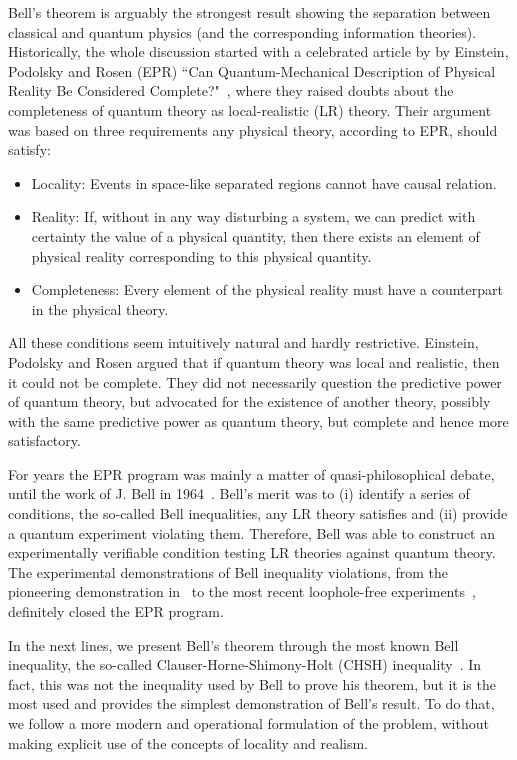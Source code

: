 \documentclass[a4paper]{article}
\begin{document}
Bell's theorem is arguably the strongest result showing the separation between classical and quantum physics (and the corresponding information theories). Historically, the whole discussion started with a celebrated article by by Einstein, Podolsky and
Rosen (EPR) ``Can Quantum-Mechanical Description of Physical Reality
Be Considered Complete?"~\cite{EPR}, where they raised doubts about the
completeness of quantum theory as local-realistic (LR) theory. Their argument was based on three requirements any physical theory, according to EPR, should
satisfy:
\begin{itemize}
    \item Locality: Events in space-like separated regions cannot have
    causal relation.
    \item Reality: If, without in any way disturbing a system, we
    can predict with certainty the value of a physical quantity,
    then there exists an element of physical reality corresponding
    to this physical quantity.
    \item Completeness: Every element of the physical reality must
    have a counterpart in the physical theory.
\end{itemize}
All these conditions seem intuitively natural and hardly
restrictive. Einstein, Podolsky and Rosen argued that if quantum theory was local and realistic, then it could not be complete. They did not necessarily question the predictive power of quantum theory, but advocated for the existence of another theory, possibly with the same predictive power as quantum theory, but complete and hence more satisfactory. 

For years the EPR program was mainly a matter of
quasi-philosophical debate, until the work of J. Bell in 1964~\cite{Bell}. Bell's merit was to (i) identify a series of
conditions, the so-called Bell inequalities, any LR theory
satisfies and (ii) provide a quantum experiment violating them.
Therefore, Bell was able to construct an experimentally verifiable
condition testing LR theories against quantum theory. The experimental
demonstrations of Bell inequality violations, from the pioneering demonstration in~\cite{Aspect,exp} to the most recent loophole-free experiments~\cite{hanson,nist,vienna}, definitely closed the EPR program. 


In the next lines, we present Bell's theorem through the most known Bell inequality, the
so-called Clauser-Horne-Shimony-Holt (CHSH) inequality~\cite{CHSH}. In fact, this was not the inequality used by Bell to prove his theorem, but it is the most used and provides the simplest demonstration of Bell's result. To do that, we follow a more modern and operational formulation of the problem, without making explicit use of the concepts of locality and realism. 
\end{document}
